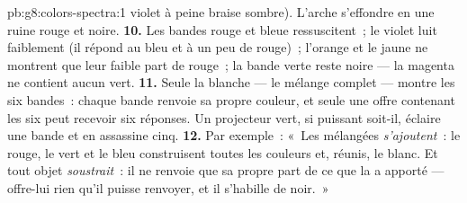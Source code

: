 \begin{solution}{pb:g8:colors-spectra:1}
violet à peine braise sombre). L'arche s'effondre en une ruine rouge
et noire.
\textbf{10.} Les bandes rouge et bleue ressuscitent~; le violet luit
faiblement (il répond au bleu et à un peu de rouge)~; l'orange et le
jaune ne montrent que leur faible part de rouge~; la bande verte
reste noire --- la  magenta ne contient aucun vert.
\textbf{11.} Seule la  blanche --- le mélange complet ---
montre les six bandes~: chaque bande renvoie sa propre couleur, et
seule une offre contenant les six peut recevoir six réponses. Un
projecteur vert, si puissant soit-il, éclaire une bande et en assassine
cinq.
\textbf{12.} Par exemple~: «~Les  mélangées
\emph{s'ajoutent}~: le rouge, le vert et le bleu construisent toutes
les couleurs et, réunis, le blanc. Et tout objet \emph{soustrait}~: il
ne renvoie que sa propre part de ce que la  a apporté ---
offre-lui rien qu'il puisse renvoyer, et il s'habille de noir.~»
\end{solution}
